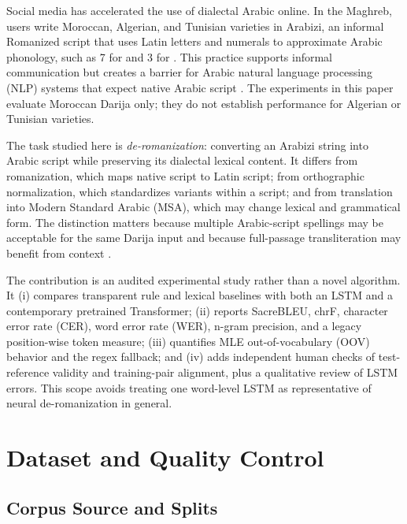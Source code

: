 \documentclass[runningheads]{llncs}
\newcommand{\textarabic}[1]{\textRL{\foreignlanguage{arabic}{#1}}}
\begin{document}
Social media has accelerated the use of dialectal Arabic online. In the Maghreb, users write Moroccan, Algerian, and Tunisian varieties in Arabizi, an informal Romanized script that uses Latin letters and numerals to approximate Arabic phonology, such as 7 for \textarabic{ح} and 3 for \textarabic{ع}. This practice supports informal communication but creates a barrier for Arabic natural language processing (NLP) systems that expect native Arabic script \citep{alayba-2025-arabic}. The experiments in this paper evaluate Moroccan Darija only; they do not establish performance for Algerian or Tunisian varieties.

The task studied here is \emph{de-romanization}: converting an Arabizi string into Arabic script while preserving its dialectal lexical content. It differs from romanization, which maps native script to Latin script; from orthographic normalization, which standardizes variants within a script; and from translation into Modern Standard Arabic (MSA), which may change lexical and grammatical form. The distinction matters because multiple Arabic-script spellings may be acceptable for the same Darija input and because full-passage transliteration may benefit from context \citep{eryani-habash-2021-automatic,kirov-etal-2024-context}.

The contribution is an audited experimental study rather than a novel algorithm. It (i) compares transparent rule and lexical baselines with both an LSTM and a contemporary pretrained Transformer; (ii) reports SacreBLEU, chrF, character error rate (CER), word error rate (WER), n-gram precision, and a legacy position-wise token measure; (iii) quantifies MLE out-of-vocabulary (OOV) behavior and the regex fallback; and (iv) adds independent human checks of test-reference validity and training-pair alignment, plus a qualitative review of LSTM errors. This scope avoids treating one word-level LSTM as representative of neural de-romanization in general.

\section{Dataset and Quality Control}

\subsection{Corpus Source and Splits}
\end{document}
